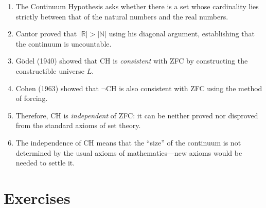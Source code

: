 \begin{enumerate}
    \item The Continuum Hypothesis asks whether there is a set whose cardinality lies strictly between that of the natural numbers and the real numbers.
    \item Cantor proved that $|\mathbb{R}| > |\mathbb{N}|$ using his diagonal argument, establishing that the continuum is uncountable.
    \item G\"odel (1940) showed that CH is \emph{consistent} with ZFC by constructing the constructible universe $L$.
    \item Cohen (1963) showed that $\neg$CH is also consistent with ZFC using the method of forcing.
    \item Therefore, CH is \emph{independent} of ZFC: it can be neither proved nor disproved from the standard axioms of set theory.
    \item The independence of CH means that the ``size'' of the continuum is not determined by the usual axioms of mathematics---new axioms would be needed to settle it.
\end{enumerate}

\section*{Exercises}

